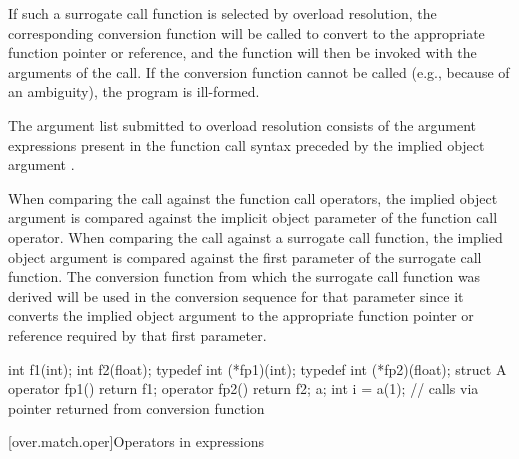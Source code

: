 \pnum
If such a surrogate call function is selected by overload
resolution, the corresponding conversion function will be called to convert
to the appropriate function pointer or reference, and the function
will then be invoked with the arguments of the call. If the
conversion function cannot be called (e.g., because of an ambiguity),
the program is ill-formed.

\pnum
The argument list submitted to overload resolution consists of
the argument expressions present in the function call syntax
preceded by the implied object argument
.
\begin{note}
When comparing the
call against the function call operators, the implied object
argument is compared against the implicit object parameter of the
function call operator.
When comparing the call against a
surrogate call function, the implied object argument is compared
against the first parameter of the surrogate call function.
The
conversion function from which the surrogate call function was
derived will be used in the conversion sequence for that
parameter since it converts the implied object argument to the
appropriate function pointer or reference required by that first
parameter.
\end{note}
\begin{example}

\begin{codeblock}
int f1(int);
int f2(float);
typedef int (*fp1)(int);
typedef int (*fp2)(float);
struct A {
  operator fp1() { return f1; }
  operator fp2() { return f2; }
} a;
int i = a(1);                   // calls  via pointer returned from conversion function
\end{codeblock}
\end{example}%

[over.match.oper]{Operators in expressions}%

